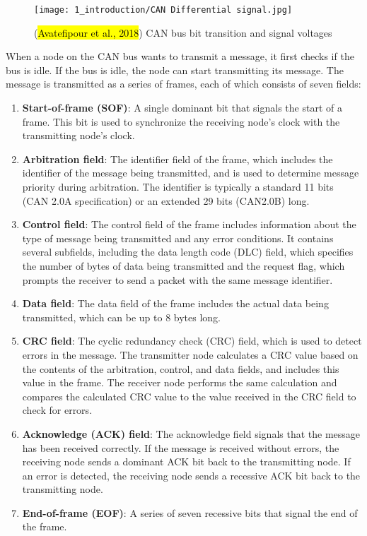  \begin{figure}[!h]
    \texttt{[image: 1\_introduction/CAN Differential signal.jpg]}
    \caption{(\hl{Avatefipour et al., 2018}) CAN bus bit transition and signal voltages}  
\end{figure}

When a node on the CAN bus wants to transmit a message, it first checks if the bus is idle. 
If the bus is idle, the node can start transmitting its message. 
The message is transmitted as a series of frames, each of which consists of seven fields:

\begin{enumerate}
    \item \textbf{Start-of-frame (SOF)}: A single dominant bit that signals the start of a frame. 
    This bit is used to synchronize the receiving node's clock with the transmitting node's clock.
    \item \textbf{Arbitration field}: The identifier field of the frame, which includes the identifier of the message being transmitted, and is used to determine message priority during arbitration. 
    The identifier is typically a standard 11 bits (CAN 2.0A specification) or an extended 29 bits (CAN2.0B) long.
    \item \textbf{Control field}: The control field of the frame includes information about the type of message being transmitted and any error conditions.
    It contains several subfields, including the data length code (DLC) field, which specifies the number of bytes of data being transmitted and the request flag, which prompts the receiver to send a packet with the same message identifier. 
    \item \textbf{Data field}: The data field of the frame includes the actual data being transmitted, which can be up to 8 bytes long.
    \item \textbf{CRC field}: The cyclic redundancy check (CRC) field, which is used to detect errors in the message. 
    The transmitter node calculates a CRC value based on the contents of the arbitration, control, and data fields, and includes this value in the frame.
    The receiver node performs the same calculation and compares the calculated CRC value to the value received in the CRC field to check for errors.
    \item \textbf{Acknowledge (ACK) field}: The acknowledge field signals that the message has been received correctly. 
    If the message is received without errors, the receiving node sends a dominant ACK bit back to the transmitting node. 
    If an error is detected, the receiving node sends a recessive ACK bit back to the transmitting node.
    \item \textbf{End-of-frame (EOF)}: A series of seven recessive bits that signal the end of the frame.
\end{enumerate}

